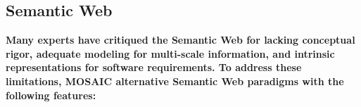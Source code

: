 \atsp
\begin{frame}{}
\section{Semantic Web}
\vspace{.5em}	


{\hspace*{-2pt}
\begin{minipage}[c]{\textwidth}\Large\centering
		\color{htxt} 	
\vspace{.1em}\textbf{%
Many experts have critiqued the Semantic Web for 
lacking conceptual rigor, adequate modeling for 
multi-scale information, and 
intrinsic representations for software 
requirements.
To address these limitations, MOSAIC 
alternative Semantic Web paradigms 
with the following features:}\end{minipage}}
\vspace{1.4em}
	

\end{frame}
